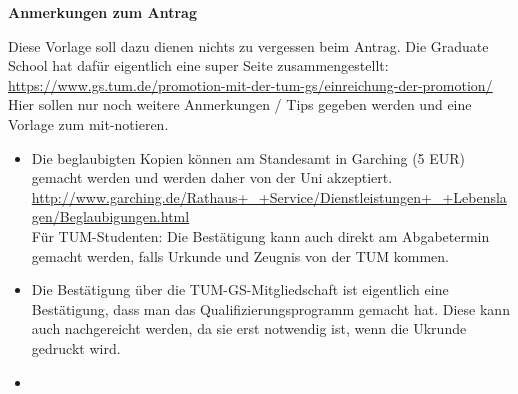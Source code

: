 


\usepackage{bibentry}



\sffamily
\setlength{\parindent}{0pt}
\setlength{\parskip}{0em}
\pagestyle{empty}

\textbf{\Large Anmerkungen zum Antrag\\[1em]}

Diese Vorlage soll dazu dienen nichts zu vergessen beim Antrag.
Die Graduate School hat dafür eigentlich eine super Seite zusammengestellt:\\
\url{https://www.gs.tum.de/promotion-mit-der-tum-gs/einreichung-der-promotion/}\\
Hier sollen nur noch weitere Anmerkungen / Tips gegeben werden und eine Vorlage zum mit-notieren.

\begin{itemize}
  \item Die beglaubigten Kopien können am Standesamt in Garching (5 EUR) gemacht werden und werden daher von der Uni akzeptiert.\\
  \url{http://www.garching.de/Rathaus+_+Service/Dienstleistungen+_+Lebenslagen/Beglaubigungen.html}\\
  Für TUM-Studenten: Die Bestätigung kann auch direkt am Abgabetermin gemacht werden, falls Urkunde und Zeugnis von der TUM kommen.
  \item Die Bestätigung über die TUM-GS-Mitgliedschaft ist eigentlich eine Bestätigung, dass man das Qualifizierungsprogramm gemacht hat. 
  Diese kann auch nachgereicht werden, da sie erst notwendig ist, wenn die Ukrunde gedruckt wird.
  \item 
\end{itemize}

\newpage

